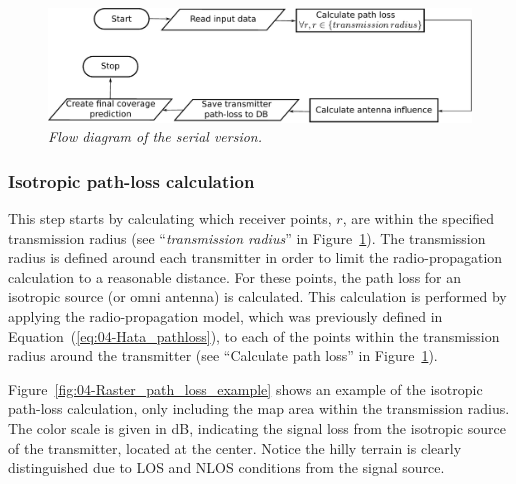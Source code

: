 \begin{figure}
\centering

\includegraphics[width=1\columnwidth]{04-framework_design_and_implementation/img/serial_implementation_flow_diagram}

\caption{\textit{\emph{Flow diagram of the serial version.}}\textit{\label{fig:04-Flow_diagram_serial_version}}}
\end{figure}



\subsubsection{Isotropic path-loss calculation\label{sub:04-Isotrophic_pahloss_calculation}}

This step starts by calculating which receiver points, $r$, are within
the specified transmission radius (see ``\emph{transmission radius}''
in Figure~\ref{fig:04-Flow_diagram_serial_version}). The transmission
radius is defined around each transmitter in order to limit the radio-propagation
calculation to a reasonable distance. For these points, the path loss
for an isotropic source (or omni antenna) is calculated. This calculation
is performed by applying the radio-propagation model, which was previously
defined in Equation~(\ref{eq:04-Hata_pathloss}), to each of the
points within the transmission radius around the transmitter (see
``Calculate path loss'' in Figure~\ref{fig:04-Flow_diagram_serial_version}).

Figure~\ref{fig:04-Raster_path_loss_example} shows an example of
the isotropic path-loss calculation, only including the map area within
the transmission radius. The color scale is given in dB, indicating
the signal loss from the isotropic source of the transmitter, located
at the center. Notice the hilly terrain is clearly distinguished due
to LOS and NLOS conditions from the signal source.

